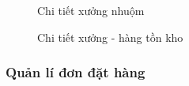\begin{figure}[H]
    \begin{center}
        \caption{Chi tiết xưởng nhuộm}
        \label{mockup_detail_plant}
    \end{center}
\end{figure}

\begin{figure}[H]
    \begin{center}
        \caption{Chi tiết xưởng  - hàng tồn kho}
        \label{mockup_detail_plant-1}
    \end{center}
\end{figure}

\subsubsection{Quản lí đơn đặt hàng}

